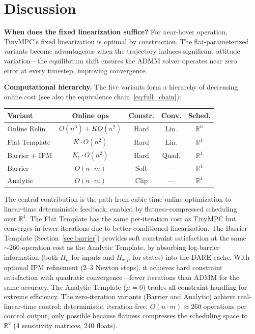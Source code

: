 \documentclass[letterpaper, 10pt, conference]{IEEEtran}
\newcommand{\R}{\mathbb{R}}
\begin{document}
\section{Discussion}\label{sec:discussion}

\textbf{When does the fixed linearization suffice?}
For near-hover operation, TinyMPC's fixed linearization is optimal
by construction.
The flat-parameterized variants become advantageous when the trajectory
induces significant attitude variation---the equilibrium shift
ensures the ADMM solver operates near zero error at every timestep,
improving convergence.

\textbf{Computational hierarchy.}
The five variants form a hierarchy of decreasing online cost
(see also the equivalence chain~\eqref{eq:full_chain}):
\begin{center}
\small
\begin{tabular}{@{}lcccc@{}}
\toprule
Variant & Online ops & Constr. & Conv. & Sched. \\
\midrule
Online Relin & $O(n^3) {+} K O(n^2)$ & Hard & Lin. & $\R^n$ \\
Flat Template & $K \cdot O(n^2)$ & Hard & Lin. & $\R^4$ \\
Barrier + IPM & $K_{\text{I}} \cdot O(n^2)$ & Hard & Quad. & $\R^4$ \\
Barrier & $O(n \cdot m)$ & Soft & --- & $\R^4$ \\
Analytic & $O(n \cdot m)$ & Clip & --- & $\R^4$ \\
\bottomrule
\end{tabular}
\end{center}
The central contribution is the path from cubic-time online
optimization to linear-time deterministic feedback, enabled
by flatness-compressed scheduling over $\R^4$.
The Flat Template has the same per-iteration cost as TinyMPC but
converges in fewer iterations due to better-conditioned linearization.
The Barrier Template (Section~\ref{sec:barrier}) provides soft
constraint satisfaction at the same ${\sim}260$-operation cost as
the Analytic Template, by absorbing log-barrier information
(both $H_\mu$ for inputs and $H_{x,\mu}$ for states)
into the DARE cache.
With optional IPM refinement (2--3 Newton steps),
it achieves hard constraint satisfaction with quadratic convergence---fewer
iterations than ADMM for the same accuracy.
The Analytic Template ($\mu = 0$) trades all constraint handling
for extreme efficiency.
The zero-iteration variants (Barrier and Analytic) achieve
real-linear-time control: deterministic, iteration-free,
$O(n{\cdot}m) \approx 260$ operations per control output,
only possible because flatness compresses the scheduling
space to $\R^4$ (4 sensitivity matrices, 240 floats).
\end{document}
